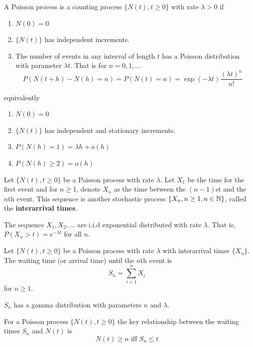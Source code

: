 \begin{defn} \cite{Ross_SP_95}
A Poisson process is a counting process $\{N(t), t \geq 0\}$ with rate $\lambda > 0$ if
\begin{enumerate}
    \item $N(0) = 0$
    \item $\{N(t)\}$ has independent increments.
    \item The number of events in any interval of length $t$ has a Poisson distribution with parameter $\lambda t$. That is for $n = 0,1,\ldots$
    $$
    P(N(t + h) - N(h) = n) = P(N(t) = n) = \exp(-\lambda t) \frac{(\lambda t)^n}{n!}
    $$
\end{enumerate}

equivalently

\begin{enumerate}
    \item $N(0) = 0$
    \item $\{N(t)\}$ has independent and stationary increments.
    \item $P(N(h) = 1) = \lambda h + o(h)$
    \item $P(N(h) \geq 2) = o(h)$
\end{enumerate}
\end{defn}

\begin{defn} \cite{Ross_SP_95}
Let $\{N(t), t \geq 0\}$ be a Poisson process with rate $\lambda$.
Let $X_1$ be the time for the first event and for $n \geq 1$,
denote $X_n$ as the time between the $(n - 1)$st and the $n$th event.
This sequence is another stochastic process $\{X_n, n \geq 1, n \in \mathbb{N}\}$, called the \textbf{interarrival times}.

The sequence $X_1,X_2, \ldots$ are i.i.d exponential distributed with rate $\lambda$. That is, $P(X_n > t) = e^{-\lambda t}$ for all $n$.
\end{defn}

\begin{defn} \cite{Ross_SP_95}
Let $\{N(t), t \geq 0\}$ be a Poisson process with rate $\lambda$ with interarrival times $\{X_n\}$.
The waiting time (or arrival time) until the $n$th event is 
$$
S_n  = \sum_{i = 1}^n X_i
$$
for $n \geq 1$.

$S_n$ has a gamma distribution with parameters $n$ and $\lambda$.
\end{defn}

\begin{remark}
For a Poisson process $\{N(t), t \geq 0\}$ the key relationship between the waiting times $S_n$ and $N(t)$ is
$$
N(t) \geq n \text{ iff } S_n \leq t
$$
\end{remark}

